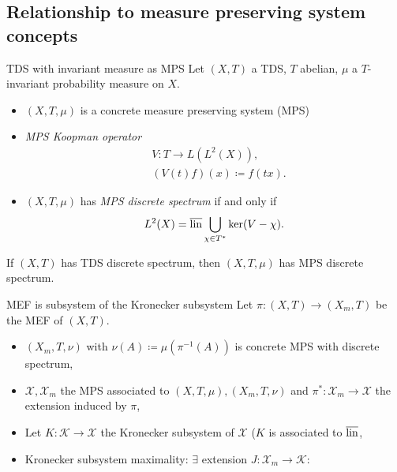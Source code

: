 \subsection{Relationship to measure preserving system concepts}
\begin{frame}{TDS with invariant measure as MPS}
Let $(X,T)$ a TDS, $T$ abelian, $\mu$ a $T$-invariant probability measure on $X$.
\begin{itemize}
  \item $(X,T,\mu)$ is a concrete measure preserving system (MPS)
    \pause
  \item \emph{MPS Koopman operator}
\begin{equation*}
  \begin{split}
    &V : T \to L(L^2(X)),\\
    & (V(t) f)(x) \coloneq f (t x). 
  \end{split}
\end{equation*}
\pause
\item
  $(X,T,\mu)$ has \emph{MPS discrete spectrum} if and only if
  \begin{equation*}
    L^2(X) = \overline{\operatorname{lin}} \bigcup_{\chi \in T^*} \ker (V - \chi).
  \end{equation*}
\end{itemize}
\pause
\begin{proposition}
  If $(X,T)$ has TDS discrete spectrum, then $(X,T,\mu)$ has MPS discrete spectrum.
  \end{proposition}
\end{frame}
\begin{frame}[fragile]{MEF is subsystem of the Kronecker subsystem}
  Let $\pi : (X,T) \to (X_m,T)$ be the MEF of $(X,T)$.
  \begin{itemize}
    \item $(X_m,T, \nu)$ with $\nu(A)\coloneq  \mu(\pi^{-1}(A))$ is concrete MPS with discrete spectrum,
      \pause
  \item $\mathcal{X}, \mathcal{X}_m$ the MPS associated to $(X,T,\mu), (X_m,T,\nu)$ and $\pi^* : \mathcal{X}_m \to \mathcal{X}$ the extension induced by $\pi$,
\pause
  \item Let $K: \mathcal{K} \to \mathcal{X}$ the Kronecker subsystem of $\mathcal{X}$ ($K$ is associated to $\overline{\operatorname{lin}}$,
  \item Kronecker subsystem maximality: $\exists$ extension $J: \mathcal{X}_m \to \mathcal{K}$:
\end{itemize}
  \begin{center}
  \end{center}
  \end{frame}

